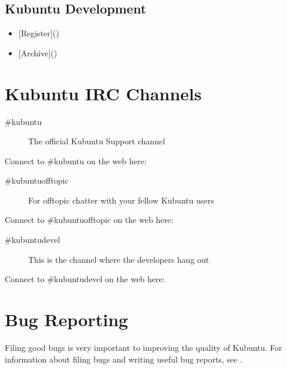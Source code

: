 \documentclass[letterpaper,10pt,english]{sphinxmanual}
\begin{document}
\subsection{Kubuntu Development}
\label{\detokenize{docs/contribute:kubuntu-development}}\begin{itemize}
\item {} 
\sphinxAtStartPar
{[}Register{]}()

\item {} 
\sphinxAtStartPar
{[}Archive{]}()

\end{itemize}


\section{Kubuntu IRC Channels}
\label{\detokenize{docs/contribute:kubuntu-irc-channels}}\begin{description}
\item[{\#kubuntu}] \leavevmode
\sphinxAtStartPar
The official Kubuntu Support channel

\end{description}

\sphinxAtStartPar
Connect to \#kubuntu on the web here: 
\begin{description}
\item[{\#kubuntu\sphinxhyphen{}offtopic}] \leavevmode
\sphinxAtStartPar
For off\sphinxhyphen{}topic chatter with your fellow Kubuntu users

\end{description}

\sphinxAtStartPar
Connect to \#kubuntu\sphinxhyphen{}offtopic on the web here: 
\begin{description}
\item[{\#kubuntu\sphinxhyphen{}devel}] \leavevmode
\sphinxAtStartPar
This is the channel where the developers hang out

\end{description}

\sphinxAtStartPar
Connect to \#kubuntu\sphinxhyphen{}devel on the web here: 


\section{Bug Reporting}
\label{\detokenize{docs/contribute:bug-reporting}}
\sphinxAtStartPar
Filing good bugs is very important to improving the quality of Kubuntu. For information about filing bugs and writing useful bug reports, see .
\end{document}
